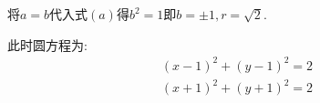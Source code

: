 \begin{questions}
\begin{solution}
\begin{enumerate}[label=(\arabic*)]
			      将$a=b$代入式$(a)$得$b^2 = 1$即$b=\pm1, r=\sqrt{2}$.

			      此时圆方程为:
			      \begin{align*}
				      (x-1)^2 + (y-1)^2 = 2 \\
				      (x+1)^2 + (y+1)^2 = 2
			      \end{align*}
		\end{enumerate}
	\end{solution}

\end{questions}
